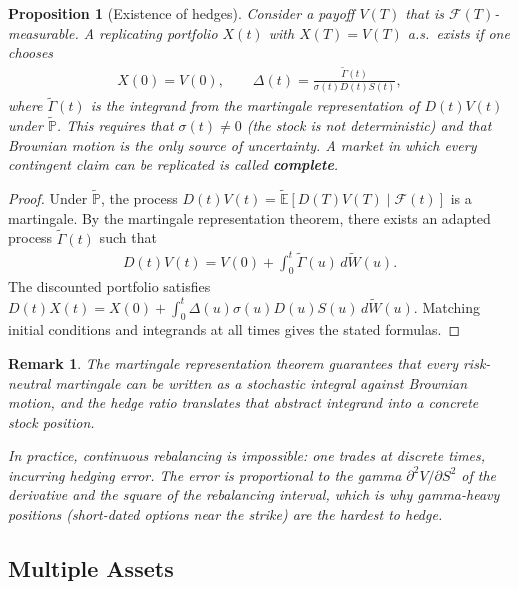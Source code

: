 \documentclass{report}
\theoremstyle{spacedplain}
\newtheorem{proposition}[theorem]{Proposition}
\theoremstyle{spaceddefinition}
\theoremstyle{spacedremark}
\newtheorem{remark}[theorem]{Remark}
\begin{document}
\begin{proposition}[Existence of hedges]
Consider a payoff $V(T)$ that is $\mathcal{F}(T)$-measurable. A replicating portfolio $X(t)$ with $X(T) = V(T)$ a.s.\ exists if one chooses
\begin{align}
    X(0) = V(0), \qquad \Delta(t) = \frac{\widetilde{\Gamma}(t)}{\sigma(t)D(t)S(t)},
\end{align}
where $\widetilde{\Gamma}(t)$ is the integrand from the martingale representation of $D(t)V(t)$ under $\widetilde{\mathbb{P}}$. This requires that $\sigma(t) \neq 0$ (the stock is not deterministic) and that Brownian motion is the only source of uncertainty. A market in which every contingent claim can be replicated is called \textbf{complete}.
\end{proposition}

\begin{proof}
Under $\widetilde{\mathbb{P}}$, the process $D(t)V(t) = \widetilde{\mathbb{E}}[D(T)V(T) \mid \mathcal{F}(t)]$ is a martingale. By the martingale representation theorem, there exists an adapted process $\widetilde{\Gamma}(t)$ such that
\begin{align}
    D(t)V(t) = V(0) + \int_0^t \widetilde{\Gamma}(u)\,d\widetilde{W}(u).
\end{align}
The discounted portfolio satisfies $D(t)X(t) = X(0) + \int_0^t \Delta(u)\sigma(u)D(u)S(u)\,d\widetilde{W}(u)$. Matching initial conditions and integrands at all times gives the stated formulas.
\end{proof}

\begin{remark}
The martingale representation theorem guarantees that every risk-neutral martingale can be written as a stochastic integral against Brownian motion, and the hedge ratio translates that abstract integrand into a concrete stock position.

In practice, continuous rebalancing is impossible: one trades at discrete times, incurring hedging error. The error is proportional to the gamma $\partial^2 V/\partial S^2$ of the derivative and the square of the rebalancing interval, which is why gamma-heavy positions (short-dated options near the strike) are the hardest to hedge.
\end{remark}


\subsection{Multiple Assets}
\end{document}
